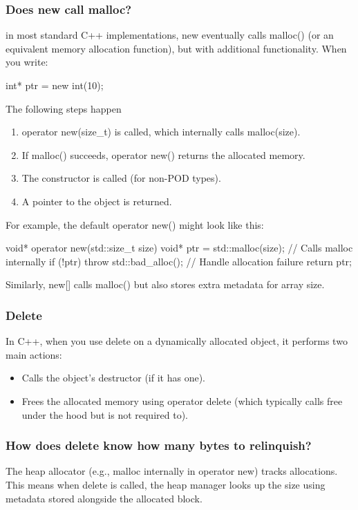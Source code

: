 \documentclass{report}
\begin{document}
    \subsubsection{Does new call malloc?}
    \bigbreak \noindent 
    in most standard C++ implementations, new eventually calls malloc() (or an equivalent memory allocation function), but with additional functionality.
    \bigbreak \noindent 
    When you write:
    \begin{cppcode}
    int* ptr = new int(10);
    \end{cppcode}
    \bigbreak \noindent 
    The following steps happen
    \begin{enumerate}
        \item operator new(size\_t) is called, which internally calls malloc(size).
        \item If malloc() succeeds, operator new() returns the allocated memory.
        \item The constructor is called (for non-POD types).
        \item A pointer to the object is returned.
    \end{enumerate}
    \bigbreak \noindent 
    For example, the default operator new() might look like this:
    \bigbreak \noindent 
    \begin{cppcode}
        void* operator new(std::size_t size) {
            void* ptr = std::malloc(size);  // Calls malloc internally
            if (!ptr) throw std::bad_alloc();  // Handle allocation failure
            return ptr;
        }
    \end{cppcode}
    \bigbreak \noindent 
    Similarly, new[] calls malloc() but also stores extra metadata for array size.

    \bigbreak \noindent 
    \subsubsection{Delete}
    \bigbreak \noindent 
    In C++, when you use delete on a dynamically allocated object, it performs two main actions:
    \begin{itemize}
        \item Calls the object's destructor (if it has one).
        \item Frees the allocated memory using operator delete (which typically calls free under the hood but is not required to).
    \end{itemize}

    \bigbreak \noindent 
    \subsubsection{How does delete know how many bytes to relinquish?}
    \bigbreak \noindent 
    The heap allocator (e.g., malloc internally in operator new) tracks allocations. This means when delete is called, the heap manager looks up the size using metadata stored alongside the allocated block.
\end{document}
